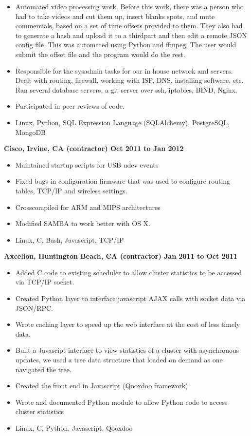 \documentclass{res}
\begin{document}
\begin{resume}
\begin{itemize}
\item Automated video processing work.  Before this work, there
was a person who had to take videos and cut them up, insert blanks spots,
and mute commercials, based on a set of time offsets provided to them.  They
also had to generate a hash and upload it to a thirdpart and then edit
a remote JSON config file.  This was automated using Python and ffmpeg.
The user would submit the offset file and the program would do the rest.

\item Responsible for the sysadmin tasks for our in house
network and servers.  Dealt with routing, firewall, working with ISP,
DNS, installing software, etc.  Ran several database servers, a git
server over ssh, iptables, BIND, Nginx.  

\item Participated in peer reviews of code.

\item Linux, Python, SQL Expression Language (SQLAlchemy), PostgreSQL, MongoDB
\end{itemize}

{\large \bf Cisco, Irvine, CA (contractor) \hfill Oct 2011 to Jan 2012}
\begin{itemize}
\item Maintained startup scripts for USB udev events
\item Fixed bugs in configuration firmware that was used to configure
 routing tables, TCP/IP and  wireless settings.
\item Crosscompiled for ARM and MIPS architectures
\item Modified SAMBA to work better with OS X.
\item Linux, C, Bash, Javascript, TCP/IP
\end{itemize}

{\large \bf Axcelion, Huntington Beach, CA (contractor) \hfill Jan 2011 to Oct 2011}
\begin{itemize}
\item Added  C code to existing scheduler to allow cluster statistics to
be accessed via TCP/IP socket.
\item Created Python layer to interface javascript AJAX calls with
socket data via JSON/RPC.
\item Wrote caching layer to speed up the web interface at the cost of
less timely data.
\item Built a Javascipt interface to view statistics of a cluster with
asynchronous updates, we used a tree data structure that loaded on
demand as one navigated the tree.
\item Created the front end in Javascript (Qooxdoo framework)
\item Wrote and documented Python module to allow Python code to
access cluster statistics
\item Linux, C, Python, Javascript, Qooxdoo
\end{itemize}


\end{resume}
\end{document}
